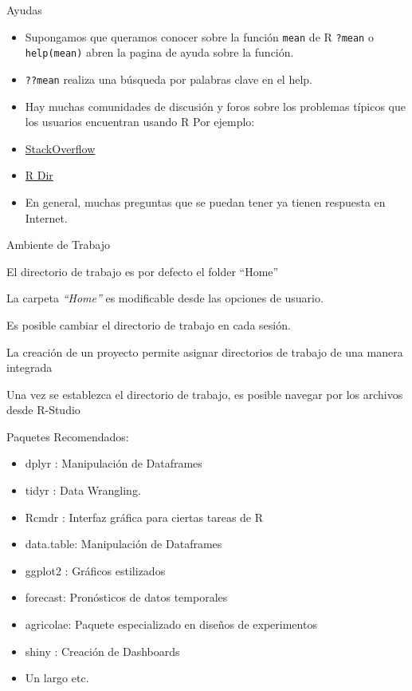 \documentclass[ignorenonframetext,]{beamer}
\providecommand{\tightlist}{%
  \setlength{\itemsep}{0pt}\setlength{\parskip}{0pt}}
\begin{document}
\begin{frame}[fragile]{Ayudas}

\begin{itemize}
\item
  Supongamos que queramos conocer sobre la función \texttt{mean} de R
  \texttt{?mean} o \texttt{help(mean)} abren la pagina de ayuda sobre la
  función.
\item
  \texttt{??mean} realiza una búsqueda por palabras clave en el help.
\item
  Hay muchas comunidades de discusión y foros sobre los problemas
  típicos que los usuarios encuentran usando R Por ejemplo:
\item
  \href{http://stackoverflow.com/}{StackOverflow}
\item
  \href{https://r-dir.com/community/forums.html}{R Dir}
\item
  En general, muchas preguntas que se puedan tener ya tienen respuesta
  en Internet.
\end{itemize}

\end{frame}

\begin{frame}{Ambiente de Trabajo}

El directorio de trabajo es por defecto el folder ``Home''

La carpeta \emph{``Home''} es modificable desde las opciones de usuario.

Es posible cambiar el directorio de trabajo en cada sesión.

La creación de un proyecto permite asignar directorios de trabajo de una
manera integrada

Una vez se establezca el directorio de trabajo, es posible navegar por
los archivos desde R-Studio

\end{frame}

\begin{frame}{Paquetes Recomendados:}

\begin{itemize}
\tightlist
\item
  dplyr : Manipulación de Dataframes
\item
  tidyr : Data Wrangling.
\item
  Rcmdr : Interfaz gráfica para ciertas tareas de R
\item
  data.table: Manipulación de Dataframes
\item
  ggplot2 : Gráficos estilizados
\item
  forecast: Pronósticos de datos temporales
\item
  agricolae: Paquete especializado en diseños de experimentos
\item
  shiny : Creación de Dashboards
\item
  Un largo etc.
\end{itemize}

\end{frame}
\end{document}
